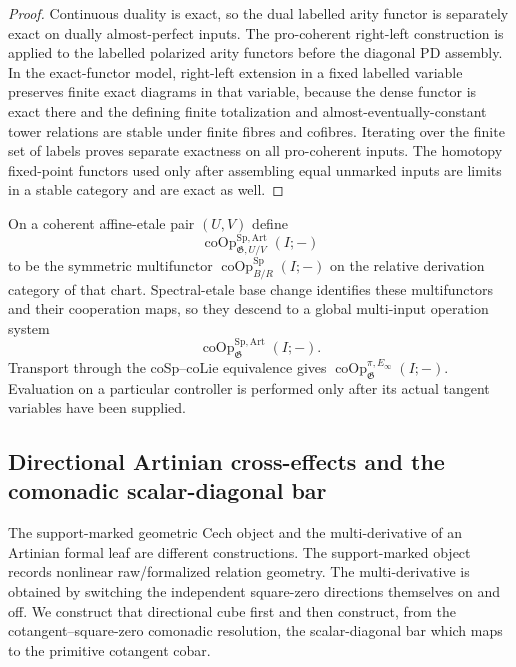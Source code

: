 \begin{proof}
Continuous duality is exact, so the dual labelled arity functor is separately
exact on dually almost-perfect inputs.  The pro-coherent right-left
construction is applied to the labelled polarized arity functors before the
diagonal PD assembly.  In the exact-functor model, right-left extension in a
fixed labelled variable preserves finite exact diagrams in that variable,
because the dense functor is exact there and the defining finite
totalization and almost-eventually-constant tower relations are stable under
finite fibres and cofibres.  Iterating over the finite set of labels proves
separate exactness on all pro-coherent inputs.  The homotopy fixed-point
functors used only after assembling equal unmarked inputs are limits in a
stable category and are exact as well.
\end{proof}

\begin{definition}
\label{def:as-descended-artinian-operations}
On a coherent affine-etale pair $(U,V)$ define
\[
    \operatorname{coOp}^{\mathrm{Sp,Art}}_{\mathfrak G,U/V}(I;-)
\]
to be the symmetric multifunctor
$\operatorname{coOp}^{\mathrm{Sp}}_{B/R}(I;-)$ on the relative derivation
category of that chart.  Spectral-etale base change identifies these
multifunctors and their cooperation maps, so they descend to a global
multi-input operation system
\[
\boxed{
    \operatorname{coOp}^{\mathrm{Sp,Art}}_{\mathfrak G}(I;-).
}
\]
Transport through the coSp--coLie equivalence gives
$\operatorname{coOp}^{\pi,E_\infty}_{\mathfrak G}(I;-)$.  Evaluation on a
particular controller is performed only after its actual tangent variables
have been supplied.
\end{definition}

\subsection{Directional Artinian cross-effects and the comonadic scalar-diagonal bar}
\label{sec:as-relative-operadic-bar}

The support-marked geometric Cech object and the multi-derivative of an
Artinian formal leaf are different constructions.  The support-marked object
records nonlinear raw/formalized relation geometry.  The multi-derivative is
obtained by switching the independent square-zero directions themselves on
and off.  We construct that directional cube first and then construct, from
the cotangent--square-zero comonadic resolution, the scalar-diagonal bar which
maps to the primitive cotangent cobar.

